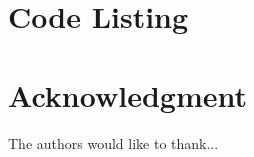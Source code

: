 \documentclass[journal]{IEEEtran}
\begin{document}

%


\appendices
\section{Code Listing}






\section*{Acknowledgment}


The authors would like to thank...
\end{document}
